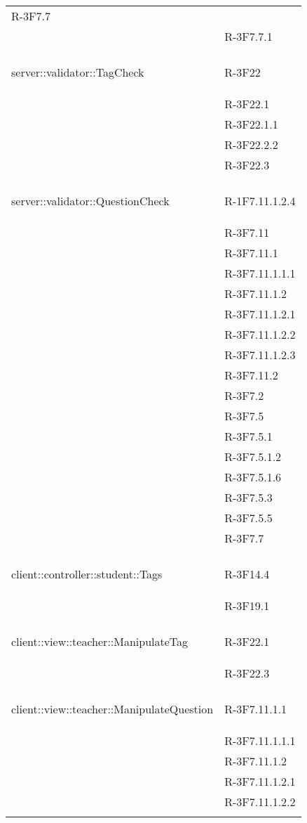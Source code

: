 \begin{longtable}{l p{3cm}}
R-3F7.7 \tabularnewline &

R-3F7.7.1 \tabularnewline &\tabularnewline
\midrule
\hypertarget{server::validator::TagCheck}{server::validator::TagCheck} & R-3F22 \tabularnewline &

R-3F22.1 \tabularnewline &

R-3F22.1.1 \tabularnewline &

R-3F22.2.2 \tabularnewline &

R-3F22.3 \tabularnewline &\tabularnewline
\midrule
\hypertarget{server::validator::QuestionCheck}{server::validator::QuestionCheck} & R-1F7.11.1.2.4 \tabularnewline &

R-3F7.11 \tabularnewline &

R-3F7.11.1 \tabularnewline &

R-3F7.11.1.1.1 \tabularnewline &

R-3F7.11.1.2 \tabularnewline &

R-3F7.11.1.2.1 \tabularnewline &

R-3F7.11.1.2.2 \tabularnewline &

R-3F7.11.1.2.3 \tabularnewline &

R-3F7.11.2 \tabularnewline &

R-3F7.2 \tabularnewline &

R-3F7.5 \tabularnewline &

R-3F7.5.1 \tabularnewline &

R-3F7.5.1.2 \tabularnewline &

R-3F7.5.1.6 \tabularnewline &

R-3F7.5.3 \tabularnewline &

R-3F7.5.5 \tabularnewline &

R-3F7.7 \tabularnewline &\tabularnewline
\midrule
\hypertarget{client::controller::student::Tags}{client::controller::student::Tags} & R-3F14.4 \tabularnewline &

R-3F19.1 \tabularnewline &\tabularnewline
\midrule
\hypertarget{client::view::teacher::ManipulateTag}{client::view::teacher::ManipulateTag} & R-3F22.1 \tabularnewline &

R-3F22.3 \tabularnewline &\tabularnewline
\midrule
\hypertarget{client::view::teacher::ManipulateQuestion}{client::view::teacher::ManipulateQuestion} & R-3F7.11.1.1 \tabularnewline &

R-3F7.11.1.1.1 \tabularnewline &

R-3F7.11.1.2 \tabularnewline &

R-3F7.11.1.2.1 \tabularnewline &

R-3F7.11.1.2.2 \tabularnewline &


\end{longtable}
